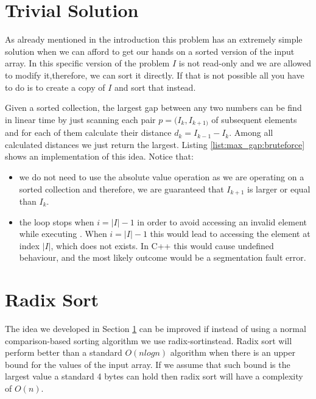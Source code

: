 

\section{Trivial Solution}
\label{max_gap:sec:trivial}
As already mentioned in the introduction this problem has an extremely simple solution when we can
afford to get our hands on a sorted version of the input array. In this specific version of the
problem $I$ is not read-only and we are allowed to modify it,therefore, we can sort it directly. If
that is not possible all you have to do is to create a copy of $I$ and sort that instead. 

Given a sorted collection, the largest gap between any two numbers can be find in linear time by
just scanning each pair $p=(I_k, I_{k+1)}$ of subsequent elements and for each of them calculate
their distance $d_k=I_{k-1}-I_k$. Among all calculated distances we just return the largest. Listing
\ref{list:max_gap:bruteforce} shows an implementation of this idea. Notice that:
\begin{itemize}
	\item we do not need to use the absolute value operation as we are operating on a sorted
	collection and therefore, we are guaranteed that $I_{k+1}$ is larger or equal than $I_k$.
	\item the  loop stops when $i=|I|-1$ in order to avoid accessing an invalid element
	while executing . When $i=|I|-1$ this would lead to accessing the element at index
	$|I|$, which does not exists. In C++ this would cause undefined behaviour, and the most likely
	outcome would be a segmentation fault error.
\end{itemize}




\section{Radix Sort}
\label{max_gap:sec:radix_sort}
The idea we developed in Section \ref{max_gap:sec:trivial} can be improved 
if instead of using a normal comparison-based sorting algorithm  we use 
radix-sort\cite{cit::wiki::radix_sort }instead. 
Radix sort will perform better than a standard $O(nlogn)$ algorithm when there is an upper bound for the values of the 
input array. If we assume that such bound is the largest value a standard 4 bytes  can hold then radix sort will 
have a complexity of $O(n)$.

